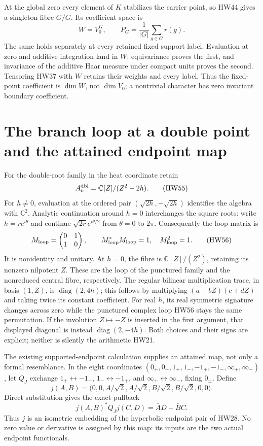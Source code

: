 \documentclass[11pt]{article}
\newcommand{\C}{\mathbb C}
\begin{document}
At the global zero every element of \(K\) stabilizes the
carrier point, so HW44 gives a singleton fibre \(G/G\).
Its coefficient space is
\[
 W=V_0^G,\qquad P_G=\frac1{|G|}\sum_{g\in G}r(g).
 \tag{HW54}
\]
The same holds separately at every retained fixed support
label. Evaluation at zero and additive integration land in
\(W\): equivariance proves the first, and invariance of
the additive Haar measure under compact units proves the
second. Tensoring HW37 with \(W\) retains their weights
and every label. Thus the fixed-point coefficient is
\(\dim W\), not \(\dim V_0\); a nontrivial character has
zero invariant boundary coefficient.

\section{The branch loop at a double point and the attained endpoint map}

For the double-root family in the heat coordinate retain
\[
 A_h^{\rm dbl}=\C[Z]/(Z^2-2h).
 \tag{HW55}
\]
For \(h\ne0\), evaluation at the ordered pair
\((\sqrt{2h},-\sqrt{2h})\) identifies the algebra with
\(\C^2\). Analytic continuation around \(h=0\) interchanges
the square roots: write \(h=re^{i\theta}\) and continue
\(\sqrt{2r}e^{i\theta/2}\) from \(\theta=0\) to \(2\pi\).
Consequently the loop matrix is
\[
 M_{\rm loop}=\begin{pmatrix}0&1\\1&0\end{pmatrix},\qquad
 M_{\rm loop}^*M_{\rm loop}=1,\quad M_{\rm loop}^2=1 .
 \tag{HW56}
\]
It is nonidentity and unitary. At \(h=0\), the fibre is
\(\C[Z]/(Z^2)\), retaining its nonzero nilpotent \(Z\).
These are the loop of the punctured family and the
nonreduced central fibre, respectively.
The regular bilinear multiplication trace, in basis \((1,Z)\), is
\(\operatorname{diag}(2,4h)\); this follows by multiplying
\((a+bZ)(c+dZ)\) and taking twice its constant coefficient.
For real \(h\), its real symmetric signature changes across zero while
the punctured complex loop HW56 stays the same permutation.
If the involution \(Z\mapsto-Z\) is inserted in the first
argument, that displayed diagonal is instead
\(\operatorname{diag}(2,-4h)\). Both choices and their signs
are explicit; neither is silently the arithmetic HW21.

The existing supported-endpoint calculation supplies an
attained map, not only a formal resemblance. In the eight
coordinates \((0_+,0_-,1_+,1_-,-1_+,-1_-,\infty_+,\infty_-)\),
let \(Q_J\) exchange \(1_+\leftrightarrow-1_-\),
\(1_-\leftrightarrow-1_+\), and
\(\infty_+\leftrightarrow\infty_-\), fixing \(0_\pm\).
Define
\[
 j(A,B)=\bigl(0,0,A/\sqrt2,A/\sqrt2,
                       B/\sqrt2,B/\sqrt2,0,0\bigr).
 \tag{HW57}
\]
Direct substitution gives the exact pullback
\[
 j(A,B)^*Q_Jj(C,D)=\bar A D+\bar B C .
 \tag{HW58}
\]
Thus \(j\) is an isometric embedding of the hyperbolic
endpoint pair of HW28. No zero value or derivative is
assigned by this map: its inputs are the two actual
endpoint functionals.
\end{document}
